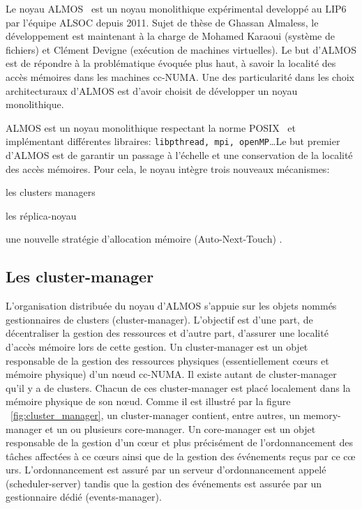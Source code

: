     Le noyau ALMOS~\cite{almaless2011almos} est un noyau monolithique
    expérimental developpé au LIP6 par l'équipe ALSOC depuis 2011. Sujet de
    thèse de Ghassan Almaless, le développement est maintenant à la charge de
    Mohamed Karaoui (système de fichiers) et Clément Devigne (exécution de
    machines virtuelles). Le but d'ALMOS est de répondre à la problématique
    évoquée plus haut, à savoir la localité des accès mémoires dans les machines
    cc-NUMA. Une des particularité dans les choix architecturaux d'ALMOS est
    d'avoir choisit de développer un noyau monolithique.

    ALMOS est un noyau monolithique respectant la norme POSIX~\cite{posix2013}
    et implémentant différentes libraires: \texttt{libpthread, mpi,
      openMP}\ldots Le but premier d'ALMOS est de garantir un passage à
    l'échelle et une conservation de la localité des accès mémoires. Pour cela,
    le noyau intègre trois nouveaux mécanismes: \benumline \item les clusters
    managers \item les réplica-noyau \item une nouvelle stratégie d'allocation
    mémoire (Auto-Next-Touch) \eenumline.

    
    \subsection{Les cluster-manager}

      L'organisation distribuée du noyau d’ALMOS s’appuie sur les objets nommés
      gestionnaires de clusters (cluster-manager). L’objectif est d’une part, de
      décentraliser la gestion des ressources et d’autre part, d’assurer une
      localité d’accès mémoire lors de cette gestion. Un cluster-manager est un
      objet responsable de la gestion des ressources physiques (essentiellement
      c\oe urs et mémoire physique) d’un nœud cc-NUMA. Il existe autant de
      cluster-manager qu’il y a de clusters. Chacun de ces cluster-manager est
      placé localement dans la mémoire physique de son n\oe ud. Comme il est
      illustré par la figure ~\ref{fig:cluster_manager}, un cluster-manager
      contient, entre autres, un memory-manager et un ou plusieurs core-manager.
      Un core-manager est un objet responsable de la gestion d’un c\oe ur et
      plus précisément de l'ordonnancement des tâches affectées à ce c\oe urs
      ainsi que de la gestion des événements reçus par ce c\oe
      urs. L'ordonnancement est assuré par un serveur d'ordonnancement appelé
      (scheduler-server) tandis que la gestion des événements est assurée par un
      gestionnaire dédié (events-manager).

